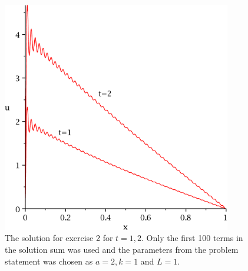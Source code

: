 \documentclass[11pt]{article}
\begin{document}
\begin{figure}
    \centering
    \includegraphics[width=100mm]{ex-2.pdf}
    \caption{The solution for exercise 2 for $t=1,2$. Only the first 100 terms in the solution sum was used and the parameters from the problem statement was chosen as $a=2, k=1$ and $L=1$.}
    \label{fig:ex2}
\end{figure}
\end{document}
